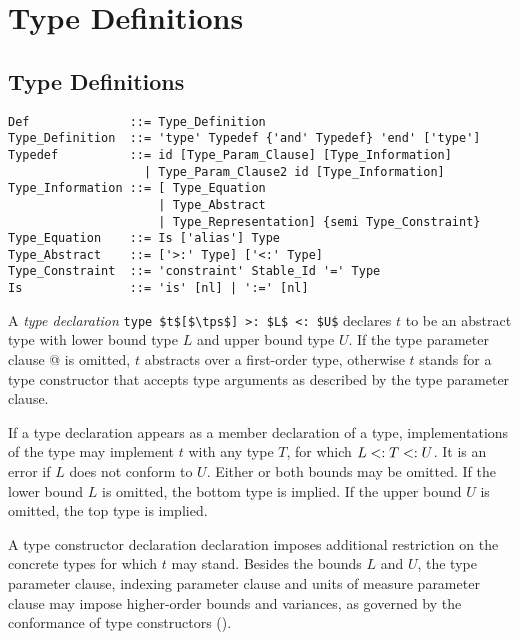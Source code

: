 
\chapter{Type Definitions}

\minitoc

\newpage

\section{Type Definitions}
\label{sec:type-decls-aliases}

\syntax\begin{lstlisting}
Def              ::= Type_Definition
Type_Definition  ::= 'type' Typedef {'and' Typedef} 'end' ['type']
Typedef          ::= id [Type_Param_Clause] [Type_Information]
                   | Type_Param_Clause2 id [Type_Information]
Type_Information ::= [ Type_Equation 
                     | Type_Abstract 
                     | Type_Representation] {semi Type_Constraint}
Type_Equation    ::= Is ['alias'] Type
Type_Abstract    ::= ['>:' Type] ['<:' Type]
Type_Constraint  ::= 'constraint' Stable_Id '=' Type
Is               ::= 'is' [nl] | ':=' [nl]
\end{lstlisting}

A {\em type declaration} \lstinline!type $t$[$\tps$] >: $L$ <: $U$! declares $t$ to be an abstract type with lower bound type $L$ and upper bound type $U$. If the type parameter clause \lstinline@[$\tps$]@ is omitted, $t$ abstracts over a first-order type, otherwise $t$ stands for a type constructor that accepts type arguments as described by the type parameter clause. 

If a type declaration appears as a member declaration of a type, implementations of the type may implement $t$ with any type $T$, for which $L <: T <: U$. It is an error if $L$ does not conform to $U$. Either or both bounds may be omitted. If the lower bound $L$ is omitted, the bottom type  is implied. If the upper bound $U$ is omitted, the top type  is implied. 

A type constructor declaration declaration imposes additional restriction on the concrete types for which $t$ may stand. Besides the bounds $L$ and $U$, the type parameter clause, indexing parameter clause and units of measure parameter clause may impose higher-order bounds and variances, as governed by the conformance of type constructors ().

